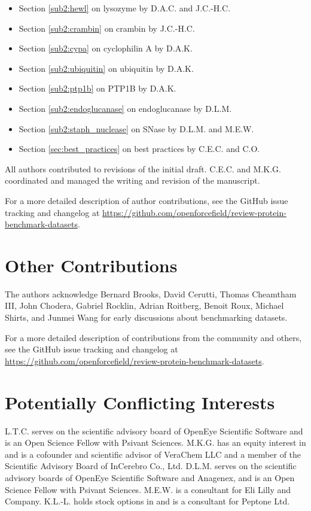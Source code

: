 \documentclass[9pt,review]{livecoms}
\newcommand{\githubrepository}{\url{https://github.com/openforcefield/review-protein-benchmark-datasets}}  %
\begin{document}
\begin{itemize}
    \item Section \ref{sub2:hewl} on lysozyme by D.A.C. and J.C.-H.C.
    \item Section \ref{sub2:crambin} on crambin by J.C.-H.C.
    \item Section \ref{sub2:cypa} on cyclophilin A by D.A.K.
    \item Section \ref{sub2:ubiquitin} on ubiquitin by D.A.K.
    \item Section \ref{sub2:ptp1b} on PTP1B by D.A.K.
    \item Section \ref{sub2:endoglucanase} on endoglucanase by D.L.M.
    \item Section \ref{sub2:staph_nuclease} on SNase by D.L.M. and M.E.W.
    \item Section \ref{sec:best_practices} on best practices by C.E.C. and C.O.
\end{itemize}
All authors contributed to revisions of the initial draft.
C.E.C. and M.K.G. coordinated and managed the writing and revision of the manuscript.

For a more detailed description of author contributions, see the GitHub issue tracking and changelog at \githubrepository.

\section*{Other Contributions}

The authors acknowledge Bernard Brooks, David Cerutti, Thomas Cheamtham III, John Chodera, Gabriel Rocklin, Adrian Roitberg, Benoit Roux, Michael Shirts, and Junmei Wang for early discussions about benchmarking datasets.

For a more detailed description of contributions from the community and others, see the GitHub issue tracking and changelog at \githubrepository.

\section*{Potentially Conflicting Interests}

L.T.C. serves on the scientific advisory board of OpenEye Scientific Software and is an Open Science Fellow with Psivant Sciences.
M.K.G. has an equity interest in and is a cofounder and scientific advisor of VeraChem LLC and a member of the Scientific Advisory Board of InCerebro Co., Ltd.
D.L.M. serves on the scientific advisory boards of OpenEye Scientific Software and Anagenex, and is an Open Science Fellow with Psivant Sciences.
M.E.W. is a consultant for Eli Lilly and Company.
K.L.-L. holds stock options in and is a consultant for Peptone Ltd.
\end{document}
